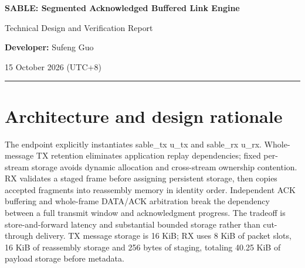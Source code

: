 \documentclass[11pt,a4paper]{article}
\begin{document}
{\sffamily\huge\raggedright\textbf{SABLE: Segmented Acknowledged Buffered Link Engine}\par}

{\large Technical Design and Verification Report}\par

\textbf{Developer:} Sufeng Guo\par

15 October 2026 (\allowbreak{}UTC+\allowbreak{}8)\allowbreak{}\par\textcolor{vulcan}{\rule{\textwidth}{0.5pt}}

\begin{abstract}

SABLE is a synthesizable,\allowbreak{} single-clock reliable message transport for four independent streams. Its 64-bit ready/\allowbreak{}valid interfaces carry 1–4096-byte messages,\allowbreak{} fragmented into payloads of at most 256 bytes. Eight-packet selective-repeat windows,\allowbreak{} CRC-32C-protected DATA and acknowledgments,\allowbreak{} bounded out-of-order storage,\allowbreak{} and complete-message reassembly implement reliability entirely in RTL.


The accepted implementation passed 36 required behavioral ledger rows,\allowbreak{} including nine seeded TX,\allowbreak{} RX and bidirectional endpoint experiments. Checker-sensitivity tests detected both injected output defects. Full-capacity generic synthesis retained substantive TX/\allowbreak{}RX hierarchy and storage,\allowbreak{} and source-only clean-directory reproduction passed its independent endpoint smoke and synthesis checks. These results establish software-simulated behavior and generic synthesizability,\allowbreak{} not physical implementation signoff.


\end{abstract}

\section{Architecture and design rationale}

The endpoint explicitly instantiates sable\_\allowbreak{}tx u\_\allowbreak{}tx and sable\_\allowbreak{}rx u\_\allowbreak{}rx. Whole-message TX retention eliminates application replay dependencies; fixed per-stream storage avoids dynamic allocation and cross-stream ownership contention. RX validates a staged frame before assigning persistent storage,\allowbreak{} then copies accepted fragments into reassembly memory in identity order. Independent ACK buffering and whole-frame DATA/\allowbreak{}ACK arbitration break the dependency between a full transmit window and acknowledgment progress. The tradeoff is store-and-forward latency and substantial bounded storage rather than cut-through delivery. TX message storage is 16 KiB; RX uses 8 KiB of packet slots,\allowbreak{} 16 KiB of reassembly storage and 256 bytes of staging,\allowbreak{} totaling 40.25 KiB of payload storage before metadata.
\end{document}
